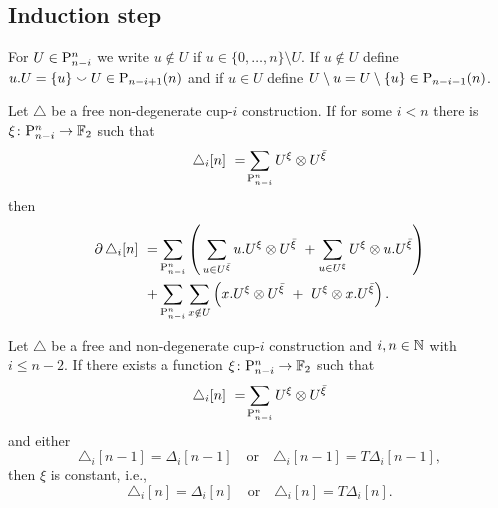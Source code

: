 
\subsection{Induction step}

\begin{notation}
	For $U \in \P_{n-i}^n$ we write $u \notin U$ if $u \in \{0, \dots, n\} \setminus U$. If $u \notin U$ define $u.U = \{u\} \union U \in \P_{n-i+1}(n)$ and if $u \in U$ define $U \setminus u = U \setminus \{u\} \in \P_{n-i-1}(n)$.
\end{notation}


\begin{lemma} \label{l:boundary triangle}
	Let $\triangle$ be a free non-degenerate cup-$i$ construction.
	If for some $i < n$ there is $\xi \colon \P_{n-i}^n \to \F$ such that
	\[
	\triangle_i [n]\ =\! \sum_{\P_{n-i}^n} {U^{\xi}} \ot {U^{\barxi}}
	\]
	then
	\begin{align*}
	\label{equation: boundary of triangle}
	\bd \triangle_i [n]\ = &
	\sum_{\P_{n-i}^n} \left( \, \sum_{u \in U^\barxi} u.U^\xi \ot U^\barxi \ +
	\sum_{u \in U^\xi} U^\xi \ot u.U^\barxi \right) \\ + &
	\sum_{\P_{n-i}^n} \sum_{x \notin U} \left( x.U^\xi \ot U^\barxi \ +\ U^\xi \ot {x.U^\barxi} \right).
	\end{align*}
\end{lemma}


\begin{lemma}
	Let $\triangle$ be a free and non-degenerate cup-$i$ construction and $i,n \in \N$ with $i \leq n-2$.
	If there exists a function $\xi \colon \P_{n-i}^n \to \F$ such that
	\[
	\triangle_i [n]\ =\! \sum_{\P_{n-i}^n} {U^{\xi}} \ot {U^{\barxi}}
	\]
	and either
	\[
	\triangle_i [n-1] = \Delta_i [n-1]
	\quad \text{or} \quad
	\triangle_i [n-1] = T\Delta_i [n-1],
	\]
	then $\xi$ is constant, i.e.,
	\[
	\triangle_i [n] = \Delta_i [n]
	\quad \text{or} \quad
	\triangle_i [n] = T \Delta_i [n].
	\]
\end{lemma}

